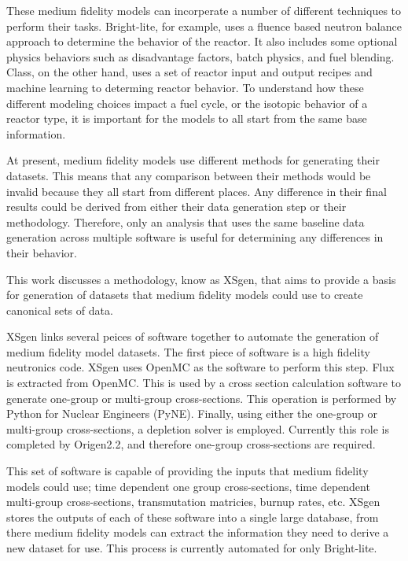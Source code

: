 \documentclass{article}
\begin{document}
These medium fidelity models can incorperate a number of different techniques to perform their tasks. Bright-lite, for example, uses a fluence based neutron balance approach to determine the behavior of the reactor. It also includes some optional physics behaviors such as disadvantage factors, batch physics, and fuel blending. Class, on the other hand, uses a set of reactor input and output recipes and machine learning to determing reactor behavior. To understand how these different modeling choices impact a fuel cycle, or the isotopic behavior of a reactor type, it is important for the models to all start from the same base information. 

At present, medium fidelity models use different methods for generating their datasets. This means that any comparison between their methods would be invalid because they all start from different places. Any difference in their final results could be derived from either their data generation step or their methodology. Therefore, only an analysis that uses the same baseline data generation across multiple software is useful for determining any differences in their behavior. 

This work discusses a methodology, know as XSgen, that aims to provide a basis for generation of datasets that medium fidelity models could use to create canonical sets of data. 

XSgen links several peices of software together to automate the generation of medium fidelity model datasets. The first piece of software is a high fidelity neutronics code. XSgen uses OpenMC as the software to perform this step. Flux is extracted from OpenMC\cite{class}. This is used by a cross section calculation software to generate one-group or multi-group cross-sections. This operation is performed by Python for Nuclear Engineers (PyNE)\cite{pyne}. Finally, using either the one-group or multi-group cross-sections, a depletion solver is employed. Currently this role is completed by Origen2.2\cite{origen2}, and therefore one-group cross-sections are required.  

This set of software is capable of providing the inputs that medium fidelity models could use; time dependent one group cross-sections, time dependent multi-group cross-sections, transmutation matricies, burnup rates, etc. XSgen stores the outputs of each of these software into a single large database, from there medium fidelity models can extract the information they need to derive a new dataset for use. This process is currently automated for only Bright-lite.
\end{document}
